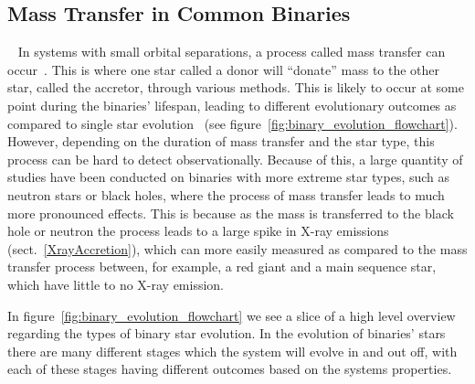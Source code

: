 \documentclass[12pt, a4paper]{article}
\begin{document}
    \subsection{Mass Transfer in Common Binaries}~\label{MassTransferinCommon}
    In systems with small orbital separations, a process called mass transfer can occur~\parencite{TaurisvandenHeuvel+2023}. This is where one star called a donor will ``donate'' mass to the other star, called the accretor, through various methods. This is likely to occur at some point during the binaries' lifespan, leading to different evolutionary outcomes as compared to single star evolution~\parencite{TaurisvandenHeuvel+2023} (see figure~\ref{fig:binary_evolution_flowchart}). However, depending on the duration of mass transfer and the star type, this process can be hard to detect observationally. Because of this, a large quantity of studies have been conducted on binaries with more extreme star types, such as neutron stars or black holes, where the process of mass transfer leads to much more pronounced effects. This is because as the mass is transferred to the black hole or neutron the process leads to a large spike in X-ray emissions (sect.~\ref{XrayAccretion}), which can more easily measured as compared to the mass transfer process between, for example, a red giant and a main sequence star, which have little to no X-ray emission.
    
    In figure~\ref{fig:binary_evolution_flowchart} we see a slice of a high level overview regarding the types of binary star evolution. In the evolution of binaries' stars there are many different stages which the system will evolve in and out off, with each of these stages having different outcomes based on the systems properties.
\end{document}
